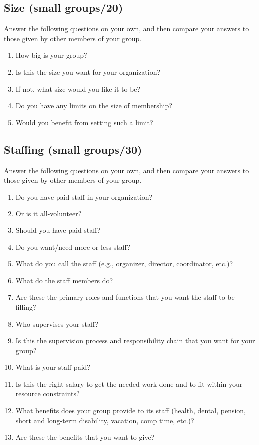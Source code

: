 \subsection*{Size (small groups/20)}

Answer the following questions on your own, and then compare your
answers to those given by other members of your group.

\begin{enumerate}
\item
  How big is your group?
\item
  Is this the size you want for your organization?
\item
  If not, what size would you like it to be?
\item
  Do you have any limits on the size of membership?
\item
  Would you benefit from setting such a limit?
\end{enumerate}

\subsection*{Staffing (small groups/30)}

Answer the following questions on your own, and then compare your
answers to those given by other members of your group.

\begin{enumerate}
\item
  Do you have paid staff in your organization?
\item
  Or is it all-volunteer?
\item
  Should you have paid staff?
\item
  Do you want/need more or less staff?
\item
  What do you call the staff (e.g., organizer, director, coordinator,
  etc.)?
\item
  What do the staff members do?
\item
  Are these the primary roles and functions that you want the staff to
  be filling?
\item
  Who supervises your staff?
\item
  Is this the supervision process and responsibility chain that you
  want for your group?
\item
  What is your staff paid?
\item
  Is this the right salary to get the needed work done and to fit
  within your resource constraints?
\item
  What benefits does your group provide to its staff (health, dental,
  pension, short and long-term disability, vacation, comp time, etc.)?
\item
  Are these the benefits that you want to give?
\end{enumerate}

